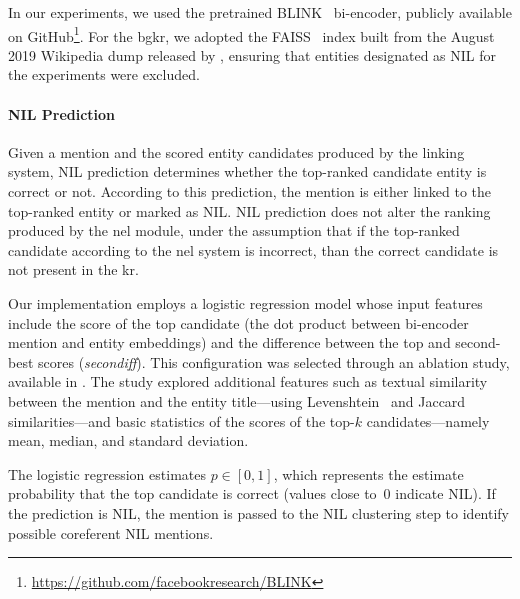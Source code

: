 In our experiments, we used the pretrained BLINK~\cite{blink} bi-encoder, publicly available on GitHub\footnote{\url{https://github.com/facebookresearch/BLINK}}. For the \ac{bgkr}, we adopted the FAISS~\cite{faiss} index built from the August 2019 Wikipedia dump released by \textcite{blink}, ensuring that entities designated as NIL for the experiments were excluded.

\paragraph{NIL Prediction} Given a mention and the scored entity candidates produced by the linking system, NIL prediction determines whether the top-ranked candidate entity is correct or not. According to this prediction, the mention is either linked to the top-ranked entity or marked as NIL. NIL prediction does not alter the ranking produced by the \ac{nel} module, under the assumption that if the top-ranked candidate according to the \ac{nel} system is incorrect, than the correct candidate is not present in the \ac{kr}.

Our implementation employs a logistic regression model whose input features include the score of the top candidate (the dot product between bi-encoder mention and entity embeddings) and the difference between the top and second-best scores (\textit{secondiff}). This configuration was selected through an ablation study, available in . The study explored additional features such as textual similarity between the mention and the entity title---using Levenshtein~\cite{levenshtein1966} and Jaccard~\cite{jaccard1901etude} similarities---and basic statistics of the scores of the top-$k$ candidates---namely mean, median, and standard deviation.

The logistic regression estimates $p \in [0,1]$, which represents the estimate probability that the top candidate is correct (values close to~0 indicate NIL). If the prediction is NIL, the mention is passed to the NIL clustering step to identify possible coreferent NIL mentions.



